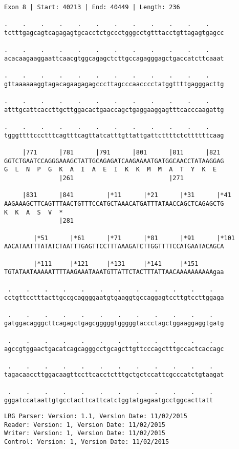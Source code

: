 \documentclass{article}
\begin{document}
\begin{Verbatim}[fontfamily=courier]
Exon 8 | Start: 40213 | End: 40449 | Length: 236

.    .    .    .    .    .    .    .    .    .    .    .    
tctttgagcagtcagagagtgcacctctgccctgggcctgtttacctgttagagtgagcc

.    .    .    .    .    .    .    .    .    .    .    .    
acacaagaaggaattcaacgtggcagagctcttgccagagggagctgaccatcttcaaat

.    .    .    .    .    .    .    .    .    .    .    .    
gttaaaaaaggtagacagaagagagcccttagcccaacccctatggttttgagggacttg

.    .    .    .    .    .    .    .    .    .    .    .    
atttgcattcaccttgcttggacactgaaccagctgaggaaggagtttcacccaagattg

.    .    .    .    .    .    .    .    .    .    .    .    
tgggttttccctttcagtttcagttatcatttgttattgattcttttctcttttttcaag

     |771      |781      |791      |801      |811      |821 
GGTCTGAATCCAGGGAAAGCTATTGCAGAGATCAAGAAAATGATGGCAACCTATAAGGAG
G  L  N  P  G  K  A  I  A  E  I  K  K  M  M  A  T  Y  K  E  
               |261                          |271           

     |831      |841         |*11      |*21      |*31      |*41
AAGAAAGCTTCAGTTTAACTGTTTCCATGCTAAACATGATTTATAACCAGCTCAGAGCTG
K  K  A  S  V  *   
               |281                                         

        |*51      |*61      |*71      |*81      |*91      |*101
AACATAATTTATATCTAATTTGAGTTCCTTTAAAGATCTTGGTTTTCCATGAATACAGCA

        |*111     |*121     |*131     |*141     |*151       
TGTATAATAAAAATTTTAAGAAATAAATGTTATTCTACTTTATTAACAAAAAAAAAAgaa

 .    .    .    .    .    .    .    .    .    .    .    .   
cctgttcctttacttgccgcaggggaatgtgaaggtgccaggagtccttgtccttggaga

 .    .    .    .    .    .    .    .    .    .    .    .   
gatggacagggcttcagagctgagcgggggtgggggtaccctagctggaaggaggtgatg

 .    .    .    .    .    .    .    .    .    .    .    .   
agccgtggaactgacatcagcagggcctgcagcttgttcccagctttgccactcaccagc

 .    .    .    .    .    .    .    .    .    .    .    .   
tagacaaccttggacaagttccttcacctctttgctgctccattcgcccatctgtaagat

 .    .    .    .    .    .    .    .    .    .    .    .
gggatccataattgtgcctacttcattcatctggtatgagaatgcctggcacttatt
\end{Verbatim}
\newpage
\begin{Verbatim}[fontfamily=courier]
LRG Parser: Version: 1.1, Version Date: 11/02/2015
Reader: Version: 1, Version Date: 11/02/2015
Writer: Version: 1, Version Date: 11/02/2015
Control: Version: 1, Version Date: 11/02/2015
\end{Verbatim}
\end{document}
